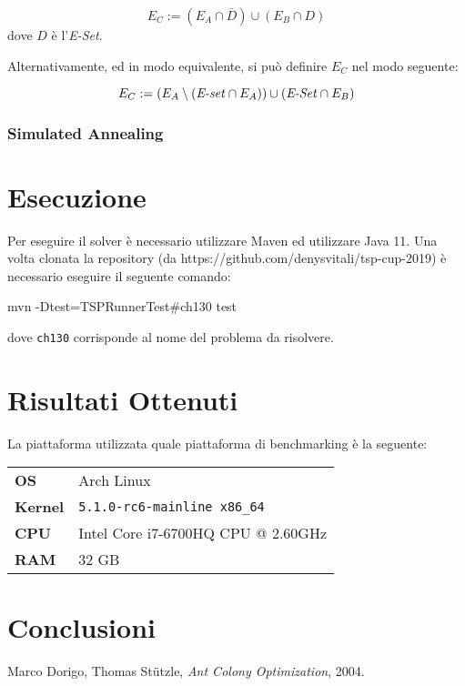 \documentclass{article}
\newcommand{\mvar}[1]{\textrm{\textit{#1}}}
\begin{document}
\begin{equation}
    E_C := (E_A \cap \bar{D}) \cup (E_B \cap D)
\end{equation}
dove $D$ è l'\mvar{E-Set}.

Alternativamente, ed in modo equivalente, si può definire $E_C$ nel modo seguente:

\begin{equation}
    E_C := (E_A \setminus (\mvar{E-set} \cap E_A)) \cup
    (\mvar{E-Set} \cap E_B)
\end{equation}

\subsubsection{Simulated Annealing}
\pagebreak
\section{Esecuzione}
Per eseguire il solver è necessario utilizzare Maven ed utilizzare Java 11.
Una volta clonata la repository (da https://github.com/denysvitali/tsp-cup-2019)
è necessario eseguire il seguente comando:
\begin{code}
mvn -Dtest=TSPRunnerTest#ch130 test
\end{code}
dove \texttt{ch130} corrisponde al nome del problema da risolvere.

\section{Risultati Ottenuti}
La piattaforma utilizzata quale piattaforma di benchmarking è la seguente:

\begin{tabular}{|l|l|}
    \hline
    \textbf{OS} & Arch Linux \\
    \textbf{Kernel} & \texttt{5.1.0-rc6-mainline x86\_64} \\
    \textbf{CPU} & Intel Core i7-6700HQ CPU @ 2.60GHz \\
    \textbf{RAM} & 32 GB \\
    \hline
\end{tabular}



\section{Conclusioni}

\pagebreak
\begin{thebibliography}{9}
Marco Dorigo, Thomas Stützle,
\textit{Ant Colony Optimization}, 2004.

\end{thebibliography}
\end{document}
